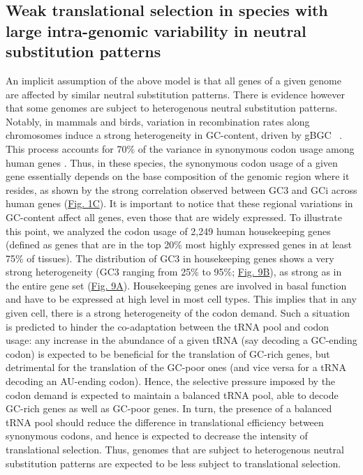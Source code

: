 \subsection{Weak translational selection in species with large intra-genomic variability in neutral substitution patterns}

An implicit assumption of the above model is that all genes of a given genome are affected by similar neutral substitution patterns. There is evidence however that some genomes are subject to heterogenous neutral substitution patterns. Notably, in mammals and birds, variation in recombination rates along chromosomes induce a strong heterogeneity in GC-content, driven by gBGC ~\citep{duret_biased_2009}. This process accounts for 70\% of the variance in synonymous codon usage among human genes \citep{pouyet_recombination_2017}. Thus, in these species, the synonymous codon usage of a given gene essentially depends on the base composition of the genomic region where it resides, as shown by the strong correlation observed between GC3 and GCi across human genes (\hyperref[fig:CU1]{Fig. 1C}). It is important to notice that these regional variations in GC-content affect all genes, even those that are widely expressed. To illustrate this point, we analyzed the codon usage of 2,249 human housekeeping genes (defined as genes that are in the top 20\% most highly expressed genes in at least 75\% of tissues). The distribution of GC3 in housekeeping genes shows a very strong heterogeneity (GC3 ranging from 25\% to 95\%; \hyperref[fig:CU9]{Fig. 9B}), as strong as in the entire gene set (\hyperref[fig:CU9]{Fig. 9A}). Housekeeping genes are involved in basal function and have to be expressed at high level in most cell types. This implies that in any given cell, there is a strong heterogeneity of the codon demand. Such a situation is predicted to hinder the co-adaptation between the tRNA pool and codon usage: any increase in the abundance of a given tRNA (say decoding a GC-ending codon) is expected to be beneficial for the translation of GC-rich genes, but detrimental for the translation of the GC-poor ones (and vice versa for a tRNA decoding an AU-ending codon). Hence, the selective pressure imposed by the codon demand is expected to maintain a balanced tRNA pool, able to decode GC-rich genes as well as GC-poor genes. In turn, the presence of a balanced tRNA pool should reduce the difference in translational efficiency between synonymous codons, and hence is expected to decrease the intensity of translational selection. Thus, genomes that are subject to heterogenous neutral substitution patterns are expected to be less subject to translational selection.
